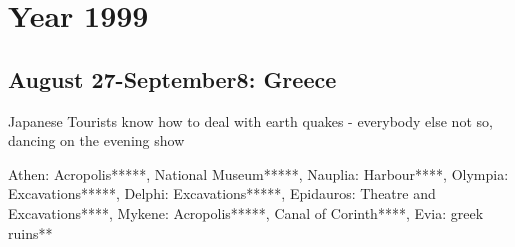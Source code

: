 \chapter{Year 1999}
\label{1999}

\section{August 27-September8: Greece}
\label{1999:Greece}


Japanese Tourists know how to deal with earth quakes - everybody else not so, dancing on the evening show

Athen: Acropolis*****, National Museum*****, Nauplia: Harbour****, Olympia: Excavations*****, Delphi: Excavations*****, Epidauros: Theatre and Excavations****, Mykene: Acropolis*****, Canal of Corinth****, Evia: greek ruins**

